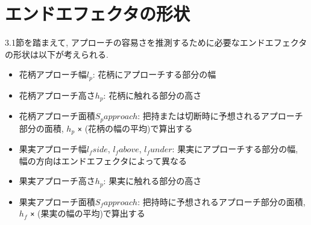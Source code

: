 \section{エンドエフェクタの形状}
3.1節を踏まえて, アプローチの容易さを推測するために必要なエンドエフェクタの形状は以下が考えられる.

\begin{itemize}
  \item 花柄アプローチ幅$l_p$: 花柄にアプローチする部分の幅
  \item 花柄アプローチ高さ$h_p$: 花柄に触れる部分の高さ
  \item 花柄アプローチ面積$S_papproach$: 把持または切断時に予想されるアプローチ部分の面積, $h_p$ \verb|×| (花柄の幅の平均)で算出する
  \item 果実アプローチ幅$l_fside$, $l_fabove$, $l_funder$: 果実にアプローチする部分の幅, 幅の方向はエンドエフェクタによって異なる
  \item 果実アプローチ高さ$h_p$: 果実に触れる部分の高さ
  \item 果実アプローチ面積$S_fapproach$: 把持時に予想されるアプローチ部分の面積, $h_f$ \verb|×| (果実の幅の平均)で算出する
\end{itemize}